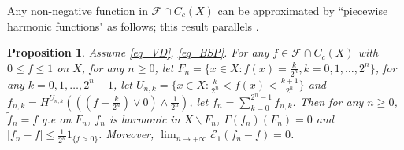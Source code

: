 \documentclass[11pt,a4paper]{article}
\numberwithin{equation}{section}
\theoremstyle{plain}
\newtheorem{proposition}[theorem]{Proposition}
\theoremstyle{definition}
\begin{document}
Any non-negative function in $\mathcal{F}\cap C_c(X)$ can be approximated by ``piecewise harmonic functions" as follows; this result parallels \cite[PROPOSITION 3.9]{KM20}.

\begin{proposition}\label{prop_harm_approx}
Assume \ref{eq_VD}, \ref{eq_BSP}. For any $f\in\mathcal{F}\cap C_c(X)$ with $0\le f\le 1$ on $X$, for any $n\ge0$, let $F_n=\{x\in X:f(x)=\frac{k}{2^n},k=0,1,\ldots,2^n\}$, for any $k=0,1,\ldots,2^n-1$, let $U_{n,k}=\{x\in X:\frac{k}{2^n}<f(x)<\frac{k+1}{2^n}\}$ and $f_{n,k}=H^{U_{n,k}}(((f-\frac{k}{2^n})\vee0)\wedge \frac{1}{2^n})$, let $f_n=\sum_{k=0}^{2^n-1}f_{n,k}$. Then for any $n\ge0$, $\widetilde{f}_n=f$ q.e on $F_n$, $f_n$ is harmonic in $X\backslash F_n$, $\Gamma(f_n)(F_n)=0$ and $|f_n-f|\le \frac{1}{2^n}1_{\{f>0\}}$. Moreover, $\lim_{n\to+\infty}\mathcal{E}_1(f_n-f)=0$.
\end{proposition}
\end{document}
